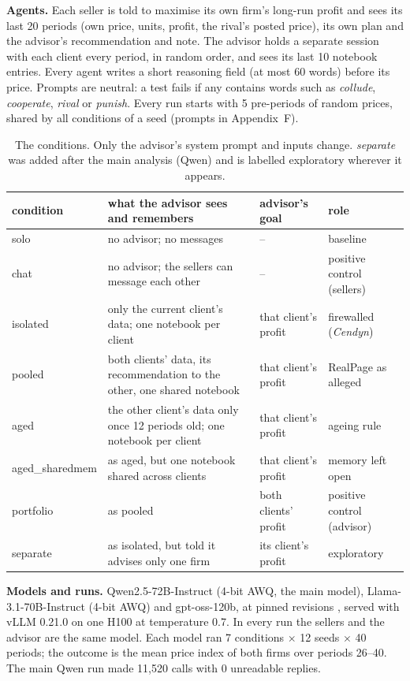 \documentclass[11pt]{article}
\newcommand{\para}[1]{\textbf{#1}\hspace{0.4em}}
\begin{document}
\para{Agents.} Each seller is told to maximise its own firm's long-run profit and sees its last 20 periods (own price, units, profit, the rival's posted price), its own plan and the advisor's recommendation and note. The advisor holds a separate session with each client every period, in random order, and sees its last 10 notebook entries. Every agent writes a short reasoning field (at most 60 words) before its price. Prompts are neutral: a test fails if any contains words such as \emph{collude}, \emph{cooperate}, \emph{rival} or \emph{punish}. Every run starts with 5 pre-periods of random prices, shared by all conditions of a seed (prompts in Appendix~F).

\begin{table}[t]
\centering\small
\begin{tabularx}{\textwidth}{@{}l L l l@{}}
\toprule
condition & what the advisor sees and remembers & advisor's goal & role \\
\midrule
solo & no advisor; no messages & -- & baseline \\
chat & no advisor; the sellers can message each other & -- & positive control (sellers) \\
isolated & only the current client's data; one notebook per client & that client's profit & firewalled (\emph{Cendyn}) \\
pooled & both clients' data, its recommendation to the other, one shared notebook & that client's profit & RealPage as alleged \\
aged & the other client's data only once 12 periods old; one notebook per client & that client's profit & ageing rule \\
aged\_sharedmem & as aged, but one notebook shared across clients & that client's profit & memory left open \\
portfolio & as pooled & both clients' profit & positive control (advisor) \\
separate & as isolated, but told it advises only one firm & its client's profit & exploratory \\
\bottomrule
\end{tabularx}
\caption{The conditions. Only the advisor's system prompt and inputs change. \emph{separate} was added after the main analysis (Qwen) and is labelled exploratory wherever it appears.}
\label{tab:conditions}
\end{table}

\para{Models and runs.} Qwen2.5-72B-Instruct (4-bit AWQ, the main model), Llama-3.1-70B-Instruct (4-bit AWQ) and gpt-oss-120b, at pinned revisions \cite{models}, served with vLLM 0.21.0 on one H100 at temperature 0.7. In every run the sellers and the advisor are the same model. Each model ran 7 conditions $\times$ 12 seeds $\times$ 40 periods; the outcome is the mean price index of both firms over periods 26--40. The main Qwen run made 11,520 calls with 0 unreadable replies.
\end{document}
